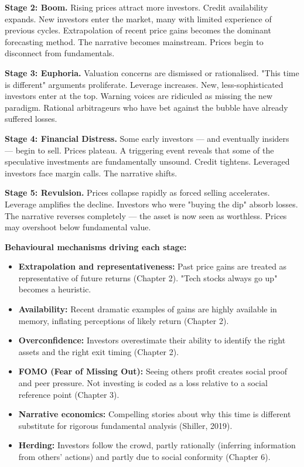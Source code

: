 \documentclass[12pt, letterpaper]{article}
\begin{document}
\textbf{Stage 2: Boom.} Rising prices attract more investors. Credit availability expands. New investors enter the market, many with limited experience of previous cycles. Extrapolation of recent price gains becomes the dominant forecasting method. The narrative becomes mainstream. Prices begin to disconnect from fundamentals.

\textbf{Stage 3: Euphoria.} Valuation concerns are dismissed or rationalised. "This time is different" arguments proliferate. Leverage increases. New, less-sophisticated investors enter at the top. Warning voices are ridiculed as missing the new paradigm. Rational arbitrageurs who have bet against the bubble have already suffered losses.

\textbf{Stage 4: Financial Distress.} Some early investors --- and eventually insiders --- begin to sell. Prices plateau. A triggering event reveals that some of the speculative investments are fundamentally unsound. Credit tightens. Leveraged investors face margin calls. The narrative shifts.

\textbf{Stage 5: Revulsion.} Prices collapse rapidly as forced selling accelerates. Leverage amplifies the decline. Investors who were "buying the dip" absorb losses. The narrative reverses completely --- the asset is now seen as worthless. Prices may overshoot below fundamental value.

\textbf{Behavioural mechanisms driving each stage:}

\begin{itemize}
\item \textbf{Extrapolation and representativeness:} Past price gains are treated as representative of future returns (Chapter 2). "Tech stocks always go up" becomes a heuristic.
\item \textbf{Availability:} Recent dramatic examples of gains are highly available in memory, inflating perceptions of likely return (Chapter 2).
\item \textbf{Overconfidence:} Investors overestimate their ability to identify the right assets and the right exit timing (Chapter 2).
\item \textbf{FOMO (Fear of Missing Out):} Seeing others profit creates social proof and peer pressure. Not investing is coded as a loss relative to a social reference point (Chapter 3).
\item \textbf{Narrative economics:} Compelling stories about why this time is different substitute for rigorous fundamental analysis (Shiller, 2019).
\item \textbf{Herding:} Investors follow the crowd, partly rationally (inferring information from others' actions) and partly due to social conformity (Chapter 6).
\end{itemize}
\end{document}
